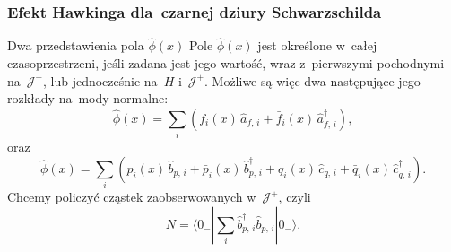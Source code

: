 \documentclass{beamer}  %
\begin{document}
\begin{frame}
  \frametitle{Efekt Hawkinga dla~czarnej dziury Schwarzschilda}

  \begin{block}{Dwa przedstawienia pola $\widehat{ \phi }( x )$}
    Pole $\widehat{ \phi }( x )$ jest określone w~całej
    czasoprzestrzeni, jeśli zadana jest jego wartość, wraz
    z~pierwszymi pochodnymi na~$\mathcal{J}^{ - }$, lub jednocześnie
    na~$H$ i~$\mathcal{J}^{ + }$. Możliwe są więc dwa następujące jego
    rozkłady na~mody normalne:
    \begin{equation}
      \label{eq:HawkingPromieniowanie-17}
      \widehat{ \phi }( x )
      = \sum_{ i }( f_{ i }( x )\, \widehat{ a }_{ f,\, i }
      + \bar{ f }_{ i }( x )\, \widehat{ a }^{ \dagger }_{ f,\, i } ),
    \end{equation}
    oraz
    \begin{equation}
      \label{eq:HawkingPromieniowanie-18}
      \widehat{ \phi }( x )
      = \sum_{ i }( p_{ i }( x )\, \widehat{ b }_{ p,\, i }
      + \bar{ p }_{ i }( x )\, \widehat{ b }^{ \dagger }_{ p,\, i }
      + q_{ i }( x )\, \widehat{ c }_{ q,\, i }
      + \bar{ q }_{ i }( x )\, \widehat{ c }^{ \dagger }_{ q,\, i } ).
    \end{equation}
    Chcemy policzyć cząstek zaobserwowanych w~$\mathcal{J}^{ + }$,
    czyli
    \begin{equation}
      \label{eq:HawkingPromieniowanie-19}
      N = \langle 0_{ - } | \sum_{ i } \widehat{ b }^{ \dagger }_{ p,\, i }
      \widehat{ b }_{ p,\, i } | 0_{ - } \rangle.
    \end{equation}
  \end{block}

\end{frame}
\end{document}
